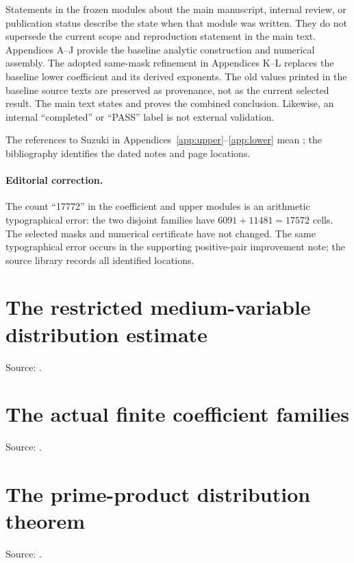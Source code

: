 \documentclass[11pt]{article}
\begin{document}
Statements in the frozen modules about the main manuscript, internal review,
or publication status describe the state when that module was written. They do
not supersede the current scope and reproduction statement in the main text.
Appendices A--J provide the baseline analytic construction and numerical
assembly. The adopted same-mask refinement in Appendices K--L replaces the
baseline lower coefficient and its derived exponents. The old values printed
in the baseline source texts are preserved as provenance, not as the current
selected result. The main text states and proves the combined conclusion.
Likewise, an internal ``completed'' or ``PASS'' label is not external validation.

The references to Suzuki in Appendices~\ref{app:upper}--\ref{app:lower}
mean \cite[Propositions~9.4(i) and 11.8, and Lemma~14.7]{Suzuki}; the bibliography
identifies the dated notes and page locations.

\paragraph{Editorial correction.}
The count ``17772'' in the coefficient and upper modules is an arithmetic
typographical error: the two disjoint families have $6091+11481=17572$ cells.
The selected masks and numerical certificate have not changed. The same
typographical error occurs in the supporting positive-pair improvement note;
the source library records all identified locations.
\clearpage
\section{The restricted medium-variable distribution estimate}\label{app:medium}
\noindent Source: .
\medskip
{}
\clearpage
\section{The actual finite coefficient families}\label{app:coefficients}
\noindent Source: .
\medskip
{}
\clearpage
\section{The prime-product distribution theorem}\label{app:prime-products}
\noindent Source: .
\medskip
{}
\clearpage
\end{document}
